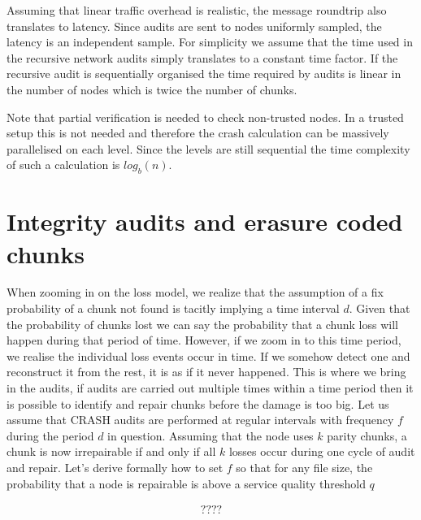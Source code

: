 \documentclass[12pt]{article}
\begin{document}
Assuming that linear traffic overhead is realistic, the message roundtrip also translates to latency. Since audits are sent to nodes uniformly sampled, the latency is an independent sample. For simplicity we assume that the time used in the recursive network audits simply translates to a constant time factor. If the recursive audit is sequentially organised the time required by audits is linear in the number of nodes which is twice the number of chunks.

Note that partial verification is needed to check non-trusted nodes. In a trusted setup this is not needed and therefore the crash calculation can be massively parallelised on each level. Since the levels are still sequential the time complexity of such a calculation is $log_{b}(n)$.

\section{Integrity audits and erasure coded chunks}

When zooming in on the loss model, we realize that the assumption of a fix probability of a chunk not found is tacitly implying a time interval $d$. Given that the probability of chunks lost we can say the probability that a chunk loss will happen during that period of time. However, if we zoom in to this time period, we realise the individual loss events occur in time. If we somehow detect one and reconstruct it from the rest, it is as if it never happened. This is where we bring in the audits, if audits are carried out multiple times within a time period then it is possible to identify and repair chunks before the damage is too big.
Let us assume that CRASH audits are performed at regular intervals with frequency $f$ during the period $d$ in question. Assuming that the node uses $k$ parity chunks,  a chunk is now irrepairable if and only if all $k$ losses occur during one cycle of audit and repair. Let's derive formally how to set $f$ so that for any file size, the probability that a node is repairable is above a service quality threshold $q$

\begin{align*}
????
\end{align*}
\end{document}
